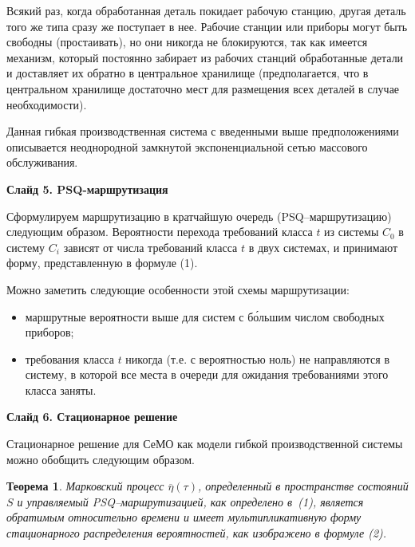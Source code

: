 \documentclass[a4paper,14pt]{extarticle}
\theoremstyle{note}
\newtheorem{theorem}{Теорема}
\begin{document}
Всякий раз, когда обработанная деталь покидает рабочую станцию, другая деталь того же типа сразу же поступает в нее. Рабочие станции или приборы могут быть свободны (простаивать), но они никогда не блокируются, так как имеется механизм, который постоянно забирает из рабочих станций обработанные детали и доставляет их обратно в центральное хранилище (предполагается, что в центральном хранилище достаточно мест для размещения всех деталей в случае необходимости).

Данная гибкая производственная система с введенными выше предположениями описывается неоднородной замкнутой экспоненциальной сетью массового обслуживания.


\textbf{Слайд 5. PSQ-маршрутизация}

Сформулируем маршрутизацию в кратчайшую очередь (PSQ--маршрутизацию) следующим образом. Вероятности перехода требований класса $t$ из системы $C_0$ в систему $C_i$ зависят от числа требований класса $t$ в двух системах, и принимают форму, представленную в формуле (1).

Можно заметить следующие особенности этой схемы маршрутизации:
\begin{itemize}
\item маршрутные вероятности выше для систем с б\'{о}льшим числом свободных приборов;
\item требования класса $t$ никогда (т.е. с вероятностью ноль) не направляются в систему, в которой все места в очереди для ожидания требованиями этого класса заняты.
\end{itemize}


\textbf{Слайд 6. Стационарное решение}

Стационарное решение для СеМО как модели гибкой производственной системы можно обобщить следующим образом.

\begin{theorem}
Марковский процесс $\overline{\eta}(\tau)$, определенный в пространстве состояний $S$ и управляемый PSQ--маршрутизацией, как определено в~(1), является обратимым относительно времени и имеет мультипликативную форму стационарного распределения вероятностей, как изображено в формуле (2).
\end{theorem}

\end{document}

